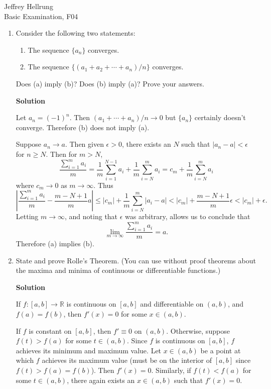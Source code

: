 \documentclass{article}
\begin{document}
\begin{flushright}
Jeffrey Hellrung \\
Basic Examination, F04 \\
\end{flushright}


\begin{enumerate}

\item Consider the following two statements:

\begin{enumerate}
\item The sequence \(\{a_n\}\) converges.

\item The sequence \(\{(a_1 + a_2 + \cdots + a_n)/n\}\) converges.

\end{enumerate}

Does (a) imply (b)?  Does (b) imply (a)?  Prove your answers.

{\bf Solution}

Let \(a_n = (-1)^n\).  Then \((a_1 + \cdots + a_n)/n \to 0\) but \(\{a_n\}\) certainly doesn't converge.  Therefore (b) does not imply (a).

Suppose \(a_n \to a\).  Then given \(\epsilon > 0\), there exists an \(N\) such that \(|a_n - a| < \epsilon\) for \(n \geq N\).  Then for \(m > N\),
\[\frac{\sum_{i = 1}^m a_i}{m}
  = \frac{1}{m} \sum_{i = 1}^{N - 1} a_i + \frac{1}{m} \sum_{i = N}^m a_i
  = c_m + \frac{1}{m} \sum_{i = N}^m a_i\]
where \(c_m \to 0\) as \(m \to \infty\).  Thus
\[\left| \frac{\sum_{i = 1}^m a_i}{m} - \frac{m - N + 1}{m} a \right|
  \leq |c_m| + \frac{1}{m} \sum_{i = N}^m |a_i - a|
     < |c_m| + \frac{m - N + 1}{m} \epsilon
     < |c_m| + \epsilon.\]
Letting \(m \to \infty\), and noting that \(\epsilon\) was arbitrary, allows us to conclude that
\[\lim_{m \to \infty} \frac{\sum_{i = 1}^m a_i}{m} = a.\]
Therefore (a) implies (b).



\item State and prove Rolle's Theorem.  (You can use without proof theorems about the maxima and minima of continuous or differentiable functions.)

{\bf Solution}

If \(f : [a,b] \to \mathbb{R}\) is continuous on \([a,b]\) and differentiable on \((a,b)\), and \(f(a) = f(b)\), then \(f'(x) = 0\) for some \(x \in (a,b)\).

If \(f\) is constant on \([a,b]\), then \(f' \equiv 0\) on \((a,b)\).  Otherwise, suppose \(f(t) > f(a)\) for some \(t \in (a,b)\).  Since \(f\) is continuous on \([a,b]\), \(f\) achieves its minimum and maximum value.  Let \(x \in (a,b)\) be a point at which \(f\) achieves its maximum value (must be on the interior of \([a,b]\) since \(f(t) > f(a) = f(b)\)).  Then \(f'(x) = 0\).  Similarly, if \(f(t) < f(a)\) for some \(t \in (a,b)\), there again exists an \(x \in (a,b)\) such that \(f'(x) = 0\).




\end{enumerate}
\end{document}
